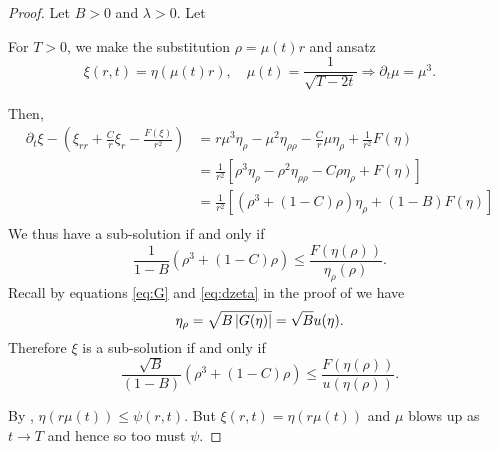 \documentclass{amsart}
\begin{document}
\begin{proof}
Let \(B > 0\) and \(\lambda > 0\). Let

For \(T > 0\), we make the substitution \(\rho = \mu(t) r\) and ansatz
\[
\xi(r, t) = \eta (\mu(t)r), \quad \mu(t) = \frac{1}{\sqrt{T - 2t}} \Rightarrow \partial_t \mu = \mu^3.
\]

Then,
\[
\begin{split}
\partial_t \xi - \left(\xi_{rr} + \tfrac{C}{r} \xi_r - \frac{F(\xi)}{r^2}\right) &= r\mu^3 \eta_{\rho} - \mu^2 \eta_{\rho\rho} - \frac{C}{r} \mu \eta_{\rho} + \frac{1}{r^2} F(\eta) \\
&= \frac{1}{r^2} \left[\rho^3 \eta_{\rho} - \rho^2 \eta_{\rho\rho} - C \rho \eta_{\rho} + F(\eta)\right] \\
&= \frac{1}{r^2} \left[(\rho^3 + (1-C)\rho)\eta_{\rho} + (1-B)F(\eta)\right] \\
\end{split}
\]
We thus have a sub-solution if and only if
\[
\frac{1}{1-B}\left(\rho^3 + (1-C)\rho\right) \leq \frac{F(\eta(\rho))}{\eta_{\rho}(\rho)}.
\]
Recall by equations \eqref{eq:G} and \eqref{eq:dzeta} in the proof of  we have
\[
\eta_{\rho} = \sqrt{B\left|{G(\eta)}\right|} = \sqrt{B} u(\eta).
\]
Therefore \(\xi\) is a sub-solution if and only if
\[
\frac{\sqrt{B}}{(1-B)} \left(\rho^3 + (1-C)\rho\right) \leq \frac{F(\eta(\rho))}{u(\eta(\rho))}.
\]

By , \(\eta(r\mu(t)) \leq \psi(r, t)\). But \(\xi(r, t) = \eta(r\mu(t))\) and \(\mu\) blows up as \(t \to T\) and hence so too must \(\psi\).
\end{proof}
\end{document}
